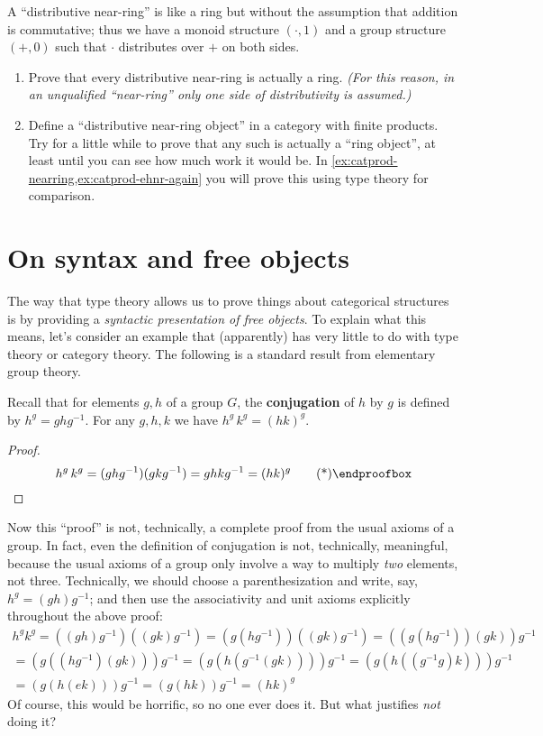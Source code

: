\begin{ex}\label{ex:near-ring}
  A ``distributive near-ring'' is like a ring but without the assumption that addition is commutative; thus we have a monoid structure $(\cdot,1)$ and a group structure $(+,0)$ such that $\cdot$ distributes over $+$ on both sides.
  \begin{enumerate}
  \item Prove that every distributive near-ring is actually a ring.
    \textit{(For this reason, in an unqualified ``near-ring'' only one side of distributivity is assumed.)}
  \item Define a ``distributive near-ring object'' in a category with finite products.
    Try for a little while to prove that any such is actually a ``ring object'', at least until you can see how much work it would be.
    In \cref{ex:catprod-nearring,ex:catprod-ehnr-again} you will prove this using type theory for comparison.
  \end{enumerate}
\end{ex}


\section{On syntax and free objects}
\label{sec:syntax}

The way that type theory allows us to prove things about categorical structures is by providing a \emph{syntactic presentation of free objects}.
To explain what this means, let's consider an example that (apparently) has very little to do with type theory or category theory.
The following is a standard result from elementary group theory.

\begin{thm}\label{thm:intro-conjugation}
  Recall that for elements $g,h$ of a group $G$, the \textbf{conjugation} of $h$ by $g$ is defined by $h^g = g h g^{-1}$.
  For any $g,h,k$ we have $h^g\,k^g = (hk)^g$.
\end{thm}
\begin{proof}
  \[ h^g\,k^g = (g h g^{-1})(g k g^{-1}) = g h k g^{-1} = (hk)^g \qedhere \]
\end{proof}

Now this ``proof'' is not, technically, a complete proof from the usual axioms of a group.
In fact, even the definition of conjugation is not, technically, meaningful, because the usual axioms of a group only involve a way to multiply \emph{two} elements, not three.
Technically, we should choose a parenthesization and write, say, $h^g = (g h) g^{-1}$; and then use the associativity and unit axioms explicitly throughout the above proof:
\begin{multline*}
  h^g k^g
  = ((g h) g^{-1})((g k) g^{-1})
  = (g (h g^{-1}))((g k) g^{-1})
  = ((g (h g^{-1}))(g k)) g^{-1}\\
  = (g ((h g^{-1})(g k))) g^{-1}
  = (g (h (g^{-1}(g k)))) g^{-1}
  = (g (h ((g^{-1} g) k))) g^{-1}\\
  = (g (h (e k))) g^{-1}
  = (g (h k)) g^{-1}
  = (h k)^g
\end{multline*}
Of course, this would be horrific, so no one ever does it.
But what justifies \emph{not} doing it?

